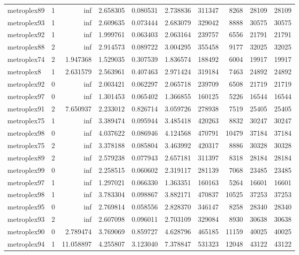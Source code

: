\documentclass[../../../thesis.tex]{subfiles}
\begin{document}
\begin{longtable}{|l|r|r|r|r|r|r|r|r|r|}
metroplex89 & 1 & inf & 2.658305 & 0.080531 & 2.738836 & 311347 & 8268 & 28109 & 28109 \\
metroplex93 & 1 & inf & 2.609635 & 0.073444 & 2.683079 & 329042 & 8888 & 30575 & 30575 \\
metroplex92 & 1 & inf & 1.999761 & 0.063403 & 2.063164 & 239757 & 6556 & 21791 & 21791 \\
metroplex88 & 2 & inf & 2.914573 & 0.089722 & 3.004295 & 355458 & 9177 & 32025 & 32025 \\
metroplex74 & 2 & 1.947368 & 1.529035 & 0.307539 & 1.836574 & 188492 & 6004 & 19917 & 19917 \\
metroplex8 & 1 & 2.631579 & 2.563961 & 0.407463 & 2.971424 & 319184 & 7463 & 24892 & 24892 \\
metroplex92 & 0 & inf & 2.003421 & 0.062297 & 2.065718 & 239709 & 6508 & 21719 & 21719 \\
metroplex97 & 0 & inf & 1.301453 & 0.065402 & 1.366855 & 160125 & 5226 & 16544 & 16544 \\
metroplex91 & 2 & 7.650937 & 2.233012 & 0.826714 & 3.059726 & 278938 & 7519 & 25405 & 25405 \\
metroplex75 & 1 & inf & 3.389474 & 0.095944 & 3.485418 & 420263 & 8832 & 30247 & 30247 \\
metroplex98 & 0 & inf & 4.037622 & 0.086946 & 4.124568 & 470791 & 10479 & 37184 & 37184 \\
metroplex75 & 2 & inf & 3.378188 & 0.085804 & 3.463992 & 420317 & 8886 & 30328 & 30328 \\
metroplex89 & 2 & inf & 2.579238 & 0.077943 & 2.657181 & 311397 & 8318 & 28184 & 28184 \\
metroplex99 & 0 & inf & 2.258515 & 0.060602 & 2.319117 & 281139 & 7068 & 23485 & 23485 \\
metroplex97 & 1 & inf & 1.297021 & 0.066330 & 1.363351 & 160163 & 5264 & 16601 & 16601 \\
metroplex98 & 1 & inf & 3.783304 & 0.098867 & 3.882171 & 470837 & 10525 & 37253 & 37253 \\
metroplex95 & 0 & inf & 2.769814 & 0.058556 & 2.828370 & 346147 & 8258 & 28340 & 28340 \\
metroplex93 & 2 & inf & 2.607098 & 0.096011 & 2.703109 & 329084 & 8930 & 30638 & 30638 \\
metroplex90 & 0 & 2.789474 & 3.769069 & 0.859727 & 4.628796 & 465185 & 11159 & 40025 & 40025 \\
metroplex94 & 1 & 11.058897 & 4.255807 & 3.123040 & 7.378847 & 531323 & 12048 & 43122 & 43122 \\

\end{longtable}
\end{document}
